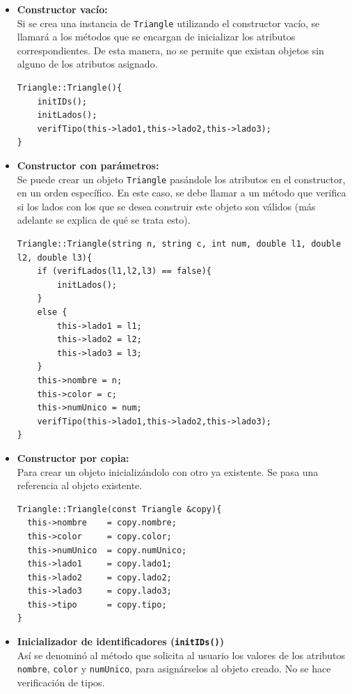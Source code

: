 \begin{itemize}
\item \textbf{Constructor vacío:}\\
Si se crea una instancia de \texttt{Triangle} utilizando el constructor vacío, se llamará a los métodos que se encargan de inicializar los atributos correspondientes. De esta manera, no se permite que existan objetos sin alguno de los atributos asignado.
\begin{verbatim}
Triangle::Triangle(){
	initIDs();
	initLados();
	verifTipo(this->lado1,this->lado2,this->lado3);
}
\end{verbatim}

\item \textbf{Constructor con parámetros:}\\
Se puede crear un objeto \texttt{Triangle} pasándole los atributos en el constructor, en un orden específico. En este caso, se debe llamar a un método que verifica si los lados con los que se desea construir este objeto son válidos (más adelante se explica de qué se trata esto).
\begin{verbatim}
Triangle::Triangle(string n, string c, int num, double l1, double l2, double l3){
	if (verifLados(l1,l2,l3) == false){
		initLados();
	}
	else {
		this->lado1 = l1;
		this->lado2 = l2;
		this->lado3 = l3;
	}
	this->nombre = n;
	this->color = c;
	this->numUnico = num;
	verifTipo(this->lado1,this->lado2,this->lado3);
}
\end{verbatim}

\item \textbf{Constructor por copia:}\\
Para crear un objeto inicializándolo con otro ya existente. Se pasa una referencia al objeto existente. 

\begin{verbatim}
Triangle::Triangle(const Triangle &copy){
  this->nombre    = copy.nombre;
  this->color     = copy.color;
  this->numUnico  = copy.numUnico;
  this->lado1     = copy.lado1;
  this->lado2     = copy.lado2;
  this->lado3     = copy.lado3;
  this->tipo      = copy.tipo;
}
\end{verbatim}


\item \textbf{Inicializador de identificadores (\texttt{initIDs()})}\\
Así se denominó al método que solicita al usuario los valores de los atributos \texttt{nombre}, \texttt{color} y \texttt{numUnico}, para asignárselos al objeto creado. No se hace verificación de tipos. 


\end{itemize}
